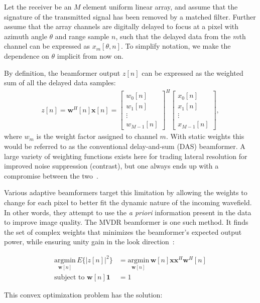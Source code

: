\documentclass[10pt,journal,draftclsnofoot,onecolumn]{IEEEtran}
\newcommand\bmat[1]{\begin{bmatrix}#1\end{bmatrix}}
\newcommand\argmin[1]{\text{arg}\;\underset{#1}{\text{min}}}
\renewcommand\H{^{\scriptscriptstyle H}}
\renewcommand\vec[1]{\boldsymbol{#1}}
\newcommand\1{\vec 1}
\newcommand*\w{\vec w}
\newcommand*\x{\vec x}
\renewcommand\argmin{\text{argmin}}
\begin{document}
Let the receiver be an $M$ element uniform linear array, and assume that the signature of the transmitted signal has been removed by a matched filter. Further assume that the array channels are digitally delayed to focus at a pixel with azimuth angle $\theta$ and range sample $n$, such that the delayed data from the $m$th channel can be expressed as $x_m[\theta,n]$. To simplify notation, we make the dependence on $\theta$ implicit from now on. 

By definition, the beamformer output $z[n]$ can be expressed as the weighted sum of all the delayed data samples:
\begin{align}
z[n] = \w\H[n]\x[n] = \bmat{w_0[n]\\w_1[n]\\\vdots\\w_{M-1}[n]}^H \bmat{x_0[n]\\x_1[n]\\\vdots\\x_{M-1}[n]},\label{z}
\end{align}
where $w_m$ is the weight factor assigned to channel $m$. With static weights this would be referred to as the conventional delay-and-sum (DAS) beamformer. A large variety of weighting functions exists here for trading lateral resolution for improved noise suppression (contrast), but one always ends up with a compromise between the two~\cite{Harris1978}.

Various adaptive beamformers target this limitation by allowing the weights to change for each pixel to better fit the dynamic nature of the incoming wavefield. In other words, they attempt to use the \emph{a priori} information present in the data to improve image quality. The MVDR beamformer is one such method. It finds the set of complex weights that minimizes the beamformer's expected output power, while ensuring unity gain in the look direction~\cite{Capon1969}:

\begin{align}
\underset{\w[n]}{\argmin}\, E\{|z[n]|^2\} &= \underset{\w[n]}{\argmin}\, \w[n]\x\x\H\w\H[n]\\
\text{subject to } \w[n]\1 &= 1
\end{align}

This convex optimization problem has the solution:
\end{document}

